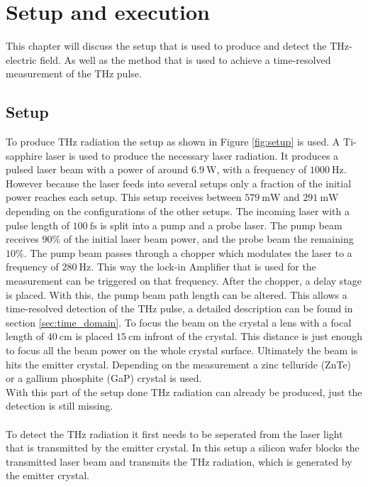 \chapter{Setup and execution}
This chapter will discuss the setup that is used to produce and detect the $\si{\tera\hertz}$-electric field.
As well as the method that is used to achieve a time-resolved measurement of the $\si{\tera\hertz}$ pulse.

\section{Setup}
\label{sec:setup}
To produce $\si{\tera\hertz}$ radiation the setup as shown in Figure \ref{fig:setup} is used.
A Ti-sapphire laser is used to produce the necessary laser radiation.
It produces a pulsed laser beam with a power of around $\SI{6.9}{\W}$, with a frequency of $\SI{1000}{\Hz}$.
However because the laser feeds into several setups only a fraction of the initial power reaches each setup.
This setup receives between $\SI{579}{\milli\W}$ and $\SI{291}{\milli\W}$ depending on the configurations of the other setups. 
The incoming laser with a pulse length of $\SI{100}{\femto\second}$ is split into a pump and a probe laser.
The pump beam receives $90\%$ of the initial laser beam power, and the probe beam the remaining $10\%$.
The pump beam passes through a chopper which modulates the laser to a frequency of $\SI{280}{\hertz}$.
This way the lock-in Amplifier that is used for the measurement can be triggered on that frequency.
After the chopper, a delay stage is placed.
With this, the pump beam path length can be altered.
This allows a time-resolved detection of the $\si{\tera\hertz}$ pulse, a detailed description can be found in section \ref{sec:time_domain}.
To focus the beam on the crystal a lens with a focal length of $\SI{40}{\centi\meter}$ is placed $\SI{15}{\centi\meter}$ infront of the crystal.
This distance is just enough to focus all the beam power on the whole crystal surface.
Ultimately the beam is hits the emitter crystal.
Depending on the measurement a zinc telluride (ZnTe) or a gallium phosphite (GaP) crystal is used.
\\
With this part of the setup done $\si{\tera\hertz}$ radiation can already be produced, just the detection is still missing.
\\\\
To detect the $\si{\tera\hertz}$ radiation it first needs to be seperated from the laser light that is transmitted by the emitter crystal.
In this setup a silicon wafer blocks the transmitted laser beam and transmits the $\si{\tera\hertz}$ radiation, which is generated by the emitter crystal.
